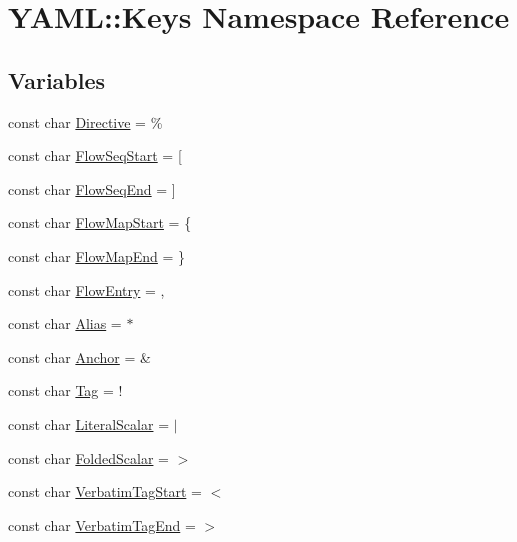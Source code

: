 \hypertarget{namespace_y_a_m_l_1_1_keys}{}\section{Y\+A\+ML\+::Keys Namespace Reference}
\label{namespace_y_a_m_l_1_1_keys}
\subsection*{Variables}
\begin{DoxyCompactItemize}
\item 
const char \mbox{\hyperlink{namespace_y_a_m_l_1_1_keys_aadb88bc7209efec974dcea99a42012b9}{Directive}} = \textquotesingle{}\%\textquotesingle{}
\item 
const char \mbox{\hyperlink{namespace_y_a_m_l_1_1_keys_ae0e293478bcc900fe92ad4d02c2bdad0}{Flow\+Seq\+Start}} = \textquotesingle{}\mbox{[}\textquotesingle{}
\item 
const char \mbox{\hyperlink{namespace_y_a_m_l_1_1_keys_a8a5d049c80da848b12083290a700a1ea}{Flow\+Seq\+End}} = \textquotesingle{}\mbox{]}\textquotesingle{}
\item 
const char \mbox{\hyperlink{namespace_y_a_m_l_1_1_keys_a0bb61fe31d7890d9801eab02edb407c2}{Flow\+Map\+Start}} = \textquotesingle{}\{\textquotesingle{}
\item 
const char \mbox{\hyperlink{namespace_y_a_m_l_1_1_keys_a4522cc6d65a0d481b4ffb93a8885a621}{Flow\+Map\+End}} = \textquotesingle{}\}\textquotesingle{}
\item 
const char \mbox{\hyperlink{namespace_y_a_m_l_1_1_keys_af7a63123923b6459be3e9485cfbf58de}{Flow\+Entry}} = \textquotesingle{},\textquotesingle{}
\item 
const char \mbox{\hyperlink{namespace_y_a_m_l_1_1_keys_a722a0d7747e07a8c3c4bc73d50d2464b}{Alias}} = \textquotesingle{}$\ast$\textquotesingle{}
\item 
const char \mbox{\hyperlink{namespace_y_a_m_l_1_1_keys_a87048f1f7c3c9a86a5764d76f77b052d}{Anchor}} = \textquotesingle{}\&\textquotesingle{}
\item 
const char \mbox{\hyperlink{namespace_y_a_m_l_1_1_keys_a11104f29a4bb388df4a7a9ee6a725d01}{Tag}} = \textquotesingle{}!\textquotesingle{}
\item 
const char \mbox{\hyperlink{namespace_y_a_m_l_1_1_keys_aaed1a54ca8c22edfb6bcba44d8208f0e}{Literal\+Scalar}} = \textquotesingle{}$\vert$\textquotesingle{}
\item 
const char \mbox{\hyperlink{namespace_y_a_m_l_1_1_keys_ad24b631271e4356afb2608e814a442f2}{Folded\+Scalar}} = \textquotesingle{}$>$\textquotesingle{}
\item 
const char \mbox{\hyperlink{namespace_y_a_m_l_1_1_keys_a631df87c258dbfe94949a4e21904440f}{Verbatim\+Tag\+Start}} = \textquotesingle{}$<$\textquotesingle{}
\item 
const char \mbox{\hyperlink{namespace_y_a_m_l_1_1_keys_a15bf1be5f6170a1c1672b4f6aaa59098}{Verbatim\+Tag\+End}} = \textquotesingle{}$>$\textquotesingle{}
\end{DoxyCompactItemize}


